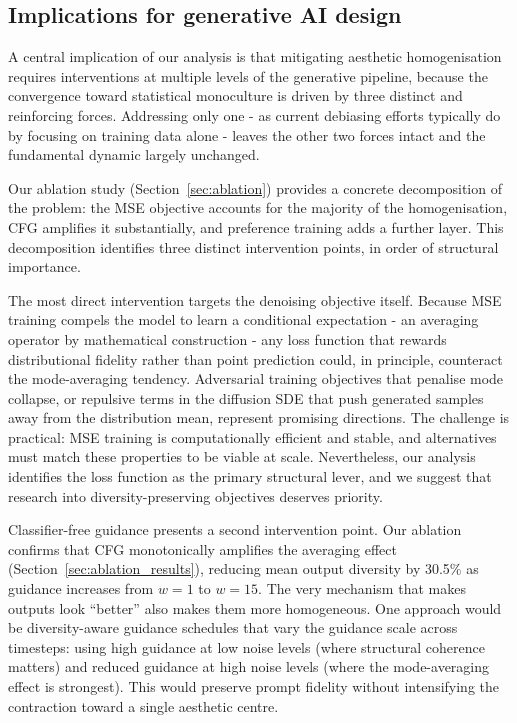 \documentclass[11pt]{article}
\begin{document}
\subsection{Implications for generative AI design}

A central implication of our analysis is that mitigating aesthetic homogenisation requires interventions at multiple levels of the generative pipeline, because the convergence toward statistical monoculture is driven by three distinct and reinforcing forces. Addressing only one - as current debiasing efforts typically do by focusing on training data alone - leaves the other two forces intact and the fundamental dynamic largely unchanged.

Our ablation study (Section~\ref{sec:ablation}) provides a concrete decomposition of the problem: the MSE objective accounts for the majority of the homogenisation, CFG amplifies it substantially, and preference training adds a further layer. This decomposition identifies three distinct intervention points, in order of structural importance.

The most direct intervention targets the denoising objective itself. Because MSE training compels the model to learn a conditional expectation - an averaging operator by mathematical construction - any loss function that rewards distributional fidelity rather than point prediction could, in principle, counteract the mode-averaging tendency. Adversarial training objectives that penalise mode collapse, or repulsive terms in the diffusion SDE that push generated samples away from the distribution mean, represent promising directions. The challenge is practical: MSE training is computationally efficient and stable, and alternatives must match these properties to be viable at scale. Nevertheless, our analysis identifies the loss function as the primary structural lever, and we suggest that research into diversity-preserving objectives deserves priority.

Classifier-free guidance presents a second intervention point. Our ablation confirms that CFG monotonically amplifies the averaging effect (Section~\ref{sec:ablation_results}), reducing mean output diversity by 30.5\% as guidance increases from $w = 1$ to $w = 15$. The very mechanism that makes outputs look ``better'' also makes them more homogeneous. One approach would be diversity-aware guidance schedules that vary the guidance scale across timesteps: using high guidance at low noise levels (where structural coherence matters) and reduced guidance at high noise levels (where the mode-averaging effect is strongest). This would preserve prompt fidelity without intensifying the contraction toward a single aesthetic centre.
\end{document}
